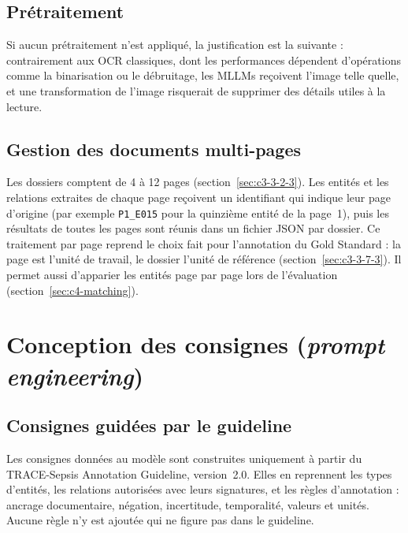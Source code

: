 \subsection{Prétraitement}\label{sec:c4-pretraitement}

 Si aucun prétraitement n'est appliqué, la justification est la suivante : contrairement aux OCR classiques, dont les performances dépendent d'opérations comme la binarisation ou le débruitage, les MLLMs reçoivent l'image telle quelle, et une transformation de l'image risquerait de supprimer des détails utiles à la lecture.

\subsection{Gestion des documents multi-pages}\label{sec:c4-multipages}

Les dossiers comptent de 4 à 12 pages (section~\ref{sec:c3-3-2-3}).  Les entités et les relations extraites de chaque page reçoivent un identifiant qui indique leur page d'origine (par exemple \texttt{P1\_E015} pour la quinzième entité de la page~1), puis les résultats de toutes les pages sont réunis dans un fichier JSON par dossier. Ce traitement par page reprend le choix fait pour l'annotation du Gold Standard : la page est l'unité de travail, le dossier l'unité de référence (section~\ref{sec:c3-3-7-3}). Il permet aussi d'apparier les entités page par page lors de l'évaluation (section~\ref{sec:c4-matching}).

\section{Conception des consignes (\emph{prompt engineering})}\label{sec:c4-prompt}

\subsection{Consignes guidées par le guideline}\label{sec:c4-guideline}

Les consignes données au modèle sont construites uniquement à partir du TRACE-Sepsis Annotation Guideline, version~2.0. Elles en reprennent les types d'entités, les relations autorisées avec leurs signatures, et les règles d'annotation : ancrage documentaire, négation, incertitude, temporalité, valeurs et unités. Aucune règle n'y est ajoutée qui ne figure pas dans le guideline.


